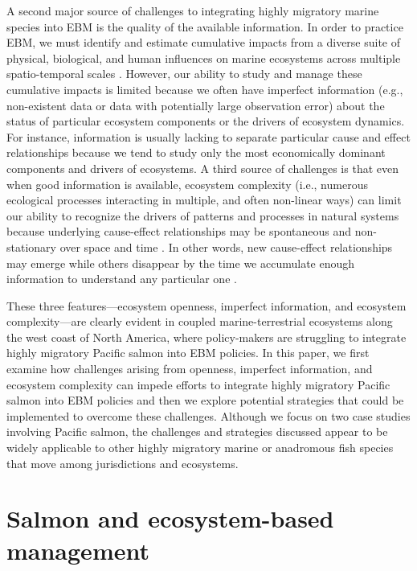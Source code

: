 A second major source of challenges to integrating highly migratory marine
species into EBM is the quality of the available information. In order to
practice EBM, we must identify and estimate cumulative impacts from a diverse
suite of physical, biological, and human influences on marine ecosystems across
multiple spatio-temporal scales \citep{Lascelles2014, Halpern2008a}. However,
our ability to study and manage these cumulative impacts is limited because we
often have imperfect information (e.g., non-existent data or data with
potentially large observation error) about the status of particular ecosystem
components or the drivers of ecosystem dynamics. For instance, information is
usually lacking to separate particular cause and effect relationships because we
tend to study only the most economically dominant components and drivers of
ecosystems. A third source of challenges is that even when good information is
available, ecosystem complexity (i.e., numerous ecological processes interacting
in multiple, and often non-linear ways) can limit our ability to recognize the
drivers of patterns and processes in natural systems because underlying
cause-effect relationships may be spontaneous and non-stationary over space and
time \citep{Hsieh2005a, Burkett2005a, Scheffer2001a}. In other words, new
cause-effect relationships may emerge while others disappear by the time we
accumulate enough information to understand any particular one
\citep{Myers1998b}.

These three features---ecosystem openness, imperfect information, and ecosystem
complexity---are clearly evident in coupled marine-terrestrial ecosystems along
the west coast of North America, where policy-makers are struggling to integrate
highly migratory Pacific salmon into EBM policies. In this paper, we first
examine how challenges arising from openness, imperfect information, and
ecosystem complexity can impede efforts to integrate highly migratory Pacific
salmon into EBM policies and then we explore potential strategies that could be
implemented to overcome these challenges. Although we focus on two case studies
involving Pacific salmon, the challenges and strategies discussed appear to be
widely applicable to other highly migratory marine or anadromous fish species
that move among jurisdictions and ecosystems.



\section{Salmon and ecosystem-based management}

